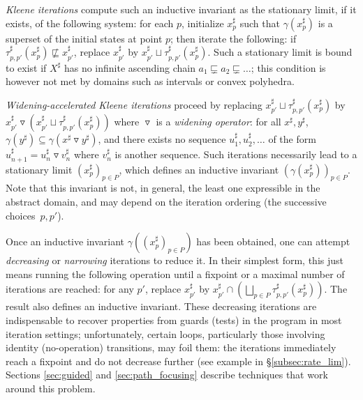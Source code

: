\documentclass{llncs}
\newcommand{\abstr}[1]{#1^\sharp}
\newcommand{\widening}{\mathop{\triangledown}}
\begin{document}
\emph{Kleene iterations} compute such an inductive invariant as the stationary limit, if it exists, of the following system: for each $p$, initialize $\abstr{x}_p$ such that $\gamma(\abstr{x}_p)$ is a superset of the initial states at point $p$; then iterate the following:
if $\abstr{\tau}_{p,p'} (\abstr{x}_p) \nsqsubseteq \abstr{x}_{p'}$, replace $\abstr{x}_{p'}$ by $\abstr{x}_{p'} \sqcup \abstr{\tau}_{p,p'} (\abstr{x}_p)$.
Such a stationary limit is bound to exist if $\abstr{X}$ has no infinite ascending chain $a_1 \sqsubsetneq a_2 \sqsubsetneq \dots$; this condition is however not met by domains such as intervals or convex polyhedra.

\emph{Widening-accelerated Kleene iterations} proceed by replacing $\abstr{x}_{p'} \sqcup \abstr{\tau}_{p,p'} (\abstr{x}_p)$ by $\abstr{x}_{p'} \widening (\abstr{x}_{p'} \sqcup \abstr{\tau}_{p,p'} (\abstr{x}_p))$ where $\widening$ is a \emph{widening operator}: for all $\abstr{x},\abstr{y}$, $\gamma(\abstr{y}) \subseteq \gamma(\abstr{x} \widening \abstr{y})$, and there exists no sequence $\abstr{u}_1,\abstr{u}_2,\dots$ of the form $\abstr{u}_{n+1} = \abstr{u}_n \widening \abstr{v}_n$ where $\abstr{v}_n$ is another sequence.
Such iterations necessarily lead to a stationary limit $(\abstr{x}_p)_{p \in P}$, which defines an inductive invariant $(\gamma(\abstr{x}_p))_{p \in P}$. Note that this invariant is not, in general, the least one expressible in the abstract domain, and may depend on the iteration ordering (the successive choices~$p,p'$).

Once an inductive invariant $\gamma((\abstr{x}_p)_{p \in P})$ has been obtained,
one can attempt \emph{decreasing} or \emph{narrowing} iterations to reduce it.
In their simplest form, this just means running the following operation until a
fixpoint or a maximal number of iterations are reached: for any $p'$, replace
$\abstr{x}_{p'}$ by $\abstr{x}_{p'} \cap \left(\bigsqcup_{p \in P}
\abstr{\tau}_{p,p'} (\abstr{x}_p)\right)$. The result also defines an inductive
invariant. These decreasing iterations are indispensable to recover properties
from guards (tests) in the program in most iteration settings; unfortunately,
certain loops, particularly those involving identity (no-operation) transitions,
may foil them: the iterations immediately reach a fixpoint and do not decrease
further (see example in \S\ref{subsec:rate_lim}). Sections \ref{sec:guided} and
\ref{sec:path_focusing} describe techniques that work around this problem.
\end{document}
